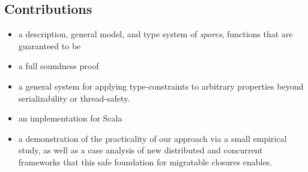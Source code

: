 \documentclass{llncs}
\begin{document}







\subsection{Contributions}

\begin{itemize}
\item a description, general model, and type system of \textit{spores}, functions that are guaranteed to be 
\item a full soundness proof
\item a general system for applying type-constraints to arbitrary properties beyond serializability or thread-safety.
\item an implementation for Scala
\item a demonstration of the practicality of our approach via a small
empirical study, as well as a case analysis of new distributed and concurrent
frameworks that this safe  foundation for migratable closures enables.

\end{itemize}
\end{document}
